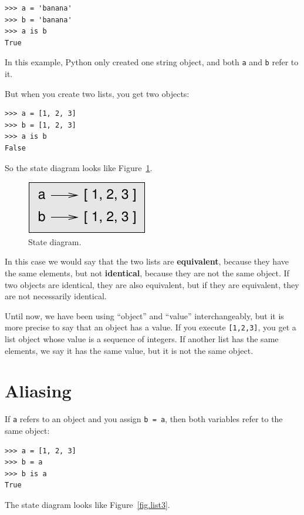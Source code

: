 \documentclass[10pt]{book}
\begin{document}
\begin{CJK}{UTF8}{gbsn}
\begin{verbatim}
>>> a = 'banana'
>>> b = 'banana'
>>> a is b
True
\end{verbatim}
%
In this example, Python only created one string object,
and both {\tt a} and {\tt b} refer to it.

But when you create two lists, you get two objects:

\begin{verbatim}
>>> a = [1, 2, 3]
>>> b = [1, 2, 3]
>>> a is b
False
\end{verbatim}
%
So the state diagram looks like Figure~\ref{fig.list2}.

\begin{figure}
\centerline
{\includegraphics[scale=0.8]{figs/list2.pdf}}
\caption{State diagram.}
\label{fig.list2}
\end{figure}


In this case we would say that the two lists are {\bf equivalent},
because they have the same elements, but not {\bf identical}, because
they are not the same object.  If two objects are identical, they are
also equivalent, but if they are equivalent, they are not necessarily
identical.

Until now, we have been using ``object'' and ``value''
interchangeably, but it is more precise to say that an object has a
value.  If you execute {\tt [1,2,3]}, you get a list
object whose value is a sequence of integers.  If another
list has the same elements, we say it has the same value, but
it is not the same object.


\section{Aliasing}

If {\tt a} refers to an object and you assign {\tt b = a},
then both variables refer to the same object:

\begin{verbatim}
>>> a = [1, 2, 3]
>>> b = a
>>> b is a
True
\end{verbatim}
%
The state diagram looks like Figure~\ref{fig.list3}.


\end{CJK}
\end{document}
